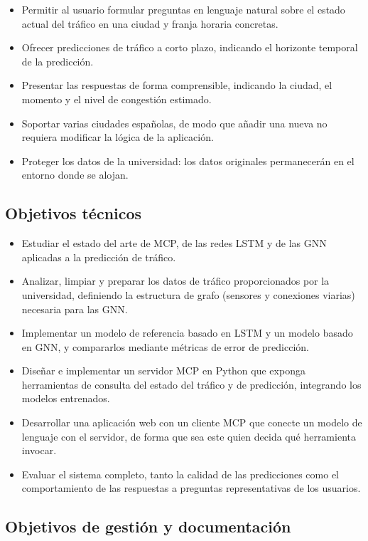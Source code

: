 \begin{itemize}
  \item Permitir al usuario formular preguntas en lenguaje natural sobre el estado actual del tráfico en una ciudad y franja horaria concretas.
  \item Ofrecer predicciones de tráfico a corto plazo, indicando el horizonte temporal de la predicción.
  \item Presentar las respuestas de forma comprensible, indicando la ciudad, el momento y el nivel de congestión estimado.
  \item Soportar varias ciudades españolas, de modo que añadir una nueva no requiera modificar la lógica de la aplicación.
  \item Proteger los datos de la universidad: los datos originales permanecerán en el entorno donde se alojan.
\end{itemize}

\subsection{Objetivos técnicos}

\begin{itemize}
  \item Estudiar el estado del arte de MCP, de las redes LSTM y de las GNN aplicadas a la predicción de tráfico.
  \item Analizar, limpiar y preparar los datos de tráfico proporcionados por la universidad, definiendo la estructura de grafo (sensores y conexiones viarias) necesaria para las GNN.
  \item Implementar un modelo de referencia basado en LSTM y un modelo basado en GNN, y compararlos mediante métricas de error de predicción.
  \item Diseñar e implementar un servidor MCP en Python que exponga herramientas de consulta del estado del tráfico y de predicción, integrando los modelos entrenados.
  \item Desarrollar una aplicación web con un cliente MCP que conecte un modelo de lenguaje con el servidor, de forma que sea este quien decida qué herramienta invocar.
  \item Evaluar el sistema completo, tanto la calidad de las predicciones como el comportamiento de las respuestas a preguntas representativas de los usuarios.
\end{itemize}

\subsection{Objetivos de gestión y documentación}


